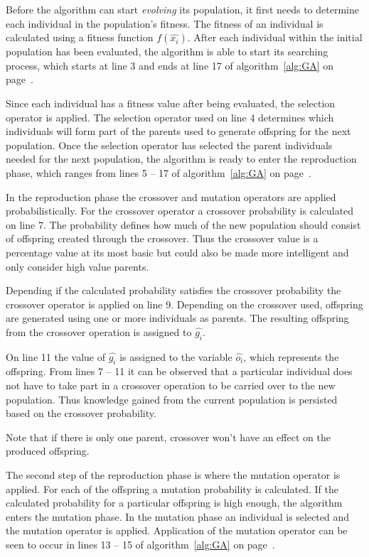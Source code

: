 Before the algorithm can start \emph{evolving} its population, it first needs to determine each individual in the population's fitness. The fitness of an individual is calculated using a fitness function $f(\hat{x_i})$. After each individual within the initial population has been evaluated, the algorithm is able to start its searching process, which starts at line 3 and ends at line 17 of algorithm~\ref{alg:GA} on page~\pageref{alg:GA}.

Since each individual has a fitness value after being evaluated, the selection operator is applied. The selection operator used on line 4 determines which individuals will form part of the parents used to generate offspring for the next population. Once the selection operator has selected the parent individuals needed for the next population, the algorithm is ready to enter the reproduction phase, which ranges from lines 5 -- 17 of algorithm~\ref{alg:GA} on page~\pageref{alg:GA}.

In the reproduction phase the crossover and mutation operators are applied probabilistically. For the crossover operator a crossover probability is calculated on line 7. The probability defines how much of the new population should consist of offspring created through the crossover. Thus the crossover value is a percentage value at its most basic but could also be made more intelligent and only consider high value parents. 

Depending if the calculated probability satisfies the crossover probability the crossover operator is applied on line 9. Depending on the crossover used, offspring are generated using one or more individuals as parents. The resulting offspring from the crossover operation is assigned to $\hat{g_i}$.

On line 11 the value of $\hat{g_i}$ is assigned to the variable $\hat{o_i}$, which represents the offspring. From lines 7 -- 11 it can be observed that a particular individual does not have to take part in a crossover operation to be carried over to the new population. Thus knowledge gained from the current population is persisted based on the crossover probability.

Note that if there is only one parent, crossover won't have an effect on the produced offspring\cite{CompuIntelligenceIntro}.

The second step of the reproduction phase is where the mutation operator is applied. For each of the offspring a mutation probability is calculated. If the calculated probability for a particular offspring is high enough, the algorithm enters the mutation phase. In the mutation phase an individual is selected and the mutation operator is applied. Application of the mutation operator can be seen to occur in lines 13 -- 15 of algorithm~\ref{alg:GA} on page~\pageref{alg:GA}.

